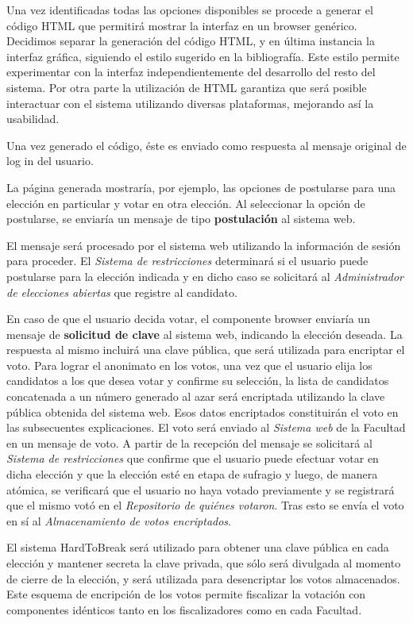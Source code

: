 Una vez identificadas todas las opciones disponibles se procede a generar el código HTML que permitirá mostrar la interfaz en un browser genérico. 
Decidimos separar la generación del código HTML, y en última instancia la interfaz gráfica, siguiendo el estilo sugerido en la bibliografía. 
Este estilo permite experimentar con la interfaz independientemente del desarrollo del resto del sistema. 
Por otra parte la utilización de HTML garantiza que será posible interactuar con el sistema utilizando diversas plataformas, mejorando así la usabilidad.


Una vez generado el código, éste es enviado como respuesta al mensaje original de log in del usuario. 

La página generada mostraría, por ejemplo, las opciones de postularse para una elección en particular y votar en otra elección. Al seleccionar la opción de postularse, se enviaría un mensaje de tipo {\bf postulación} al sistema web. 

El mensaje será procesado por el sistema web utilizando la información de sesión para proceder. 
El \emph{Sistema de restricciones} determinará si el usuario puede postularse para la elección indicada y en dicho caso se solicitará al \emph{Administrador de elecciones abiertas} que registre al candidato. 


En caso de que el usuario decida votar, el componente browser enviaría un mensaje de {\bf solicitud de clave} al sistema web, indicando la elección deseada. 
La respuesta al mismo incluirá una clave pública, que será utilizada para encriptar el voto. 
Para lograr el anonimato en los votos, una vez que el usuario elija los candidatos a los que desea votar y confirme su selección, la lista de candidatos concatenada a un número generado al azar será encriptada utilizando la clave pública obtenida del sistema web. 
Esos datos encriptados constituirán el voto en las subsecuentes explicaciones. 
El voto será enviado al \emph{Sistema web} de la Facultad en un mensaje de voto. 
A partir de la recepción del mensaje se solicitará al \emph{Sistema de restricciones} que confirme que el usuario puede efectuar votar en dicha elección y que la elección esté en etapa de sufragio y luego, de manera atómica, se verificará que el usuario no haya votado previamente y se registrará que el mismo votó en el \emph{Repositorio de quiénes votaron}. 
Tras esto se envía el voto en sí al \emph{Almacenamiento de votos encriptados}.

El sistema HardToBreak será utilizado para obtener una clave pública en cada elección y mantener secreta la clave privada, que sólo será divulgada al momento de cierre de la elección, y será utilizada para desencriptar los votos almacenados. 
Este esquema de encripción de los votos permite fiscalizar la votación con componentes idénticos tanto en los fiscalizadores como en cada Facultad.



